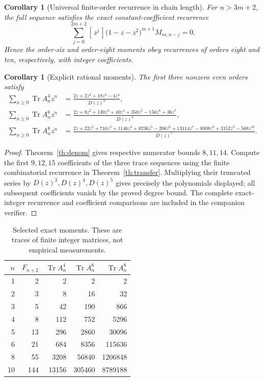 \documentclass[10pt,a4paper]{article}
\newtheorem{corollary}[theorem]{Corollary}
\newcommand{\Tr}{\operatorname{Tr}}
\newcommand{\coef}[1]{[\, #1\,]}
\begin{document}
\begin{corollary}[Universal finite-order recurrence in chain length]
For $n>3m+2$, the full sequence satisfies the exact constant-coefficient recurrence
\begin{equation}\label{eq:chain-rec}
\sum_{j=0}^{2m+2}\coef{z^j}\bigl(1-z-z^2\bigr)^{m+1} M_{m,n-j}=0.
\end{equation}
Hence the order-six and order-eight moments obey recurrences of orders eight and ten, respectively, with integer coefficients.
\end{corollary}

\begin{corollary}[Explicit rational moments]\label{cor:moment}
The first three nonzero even orders satisfy
\begin{align}\label{eq:4th}
\sum_{n\ge0}\Tr A_n^4z^n&=\frac{2z+2z^2+18z^3-4z^4}{D(z)^3},\\[3pt]
\sum_{n\ge0}\Tr A_n^6z^n&=\frac{2z+8z^2+130z^3+40z^4+350z^5-156z^6+36z^7}{D(z)^4},\label{eq:6th}\\[3pt]
\sum_{n\ge0}\Tr A_n^8z^n&=\frac{2z+22z^2+716z^3+1146z^4+8236z^5-206z^6+13114z^7-8308z^8+3152z^9-568z^{10}}{D(z)^5}.\label{eq:8th}
\end{align}
\end{corollary}
\begin{proof}
Theorem~\ref{th:denom} gives respective numerator bounds $8,11,14$. Compute the first $9,12,15$ coefficients of the three trace sequences using the finite combinatorial recurrence in Theorem~\ref{th:transfer}. Multiplying their truncated series by $D(z)^3,D(z)^4,D(z)^5$ gives precisely the polynomials displayed; all subsequent coefficients vanish by the proved degree bound. The complete exact-integer recurrence and coefficient comparisons are included in the companion verifier.
\end{proof}

\begin{table}[t]\centering\small
\caption{Selected exact moments. These are traces of finite integer matrices, not empirical measurements.}
\begin{tabular}{r r r r r}\toprule
$n$ & $F_{n+2}$ & $\Tr A_n^4$ & $\Tr A_n^6$ & $\Tr A_n^8$\\\midrule
1&2&2&2&2\\
2&3&8&16&32\\
3&5&42&190&866\\
4&8&112&752&5296\\
5&13&296&2860&30096\\
6&21&684&8356&115636\\
8&55&3208&56840&1206848\\
10&144&13156&305460&8789188\\
\bottomrule\end{tabular}
\end{table}
\end{document}
